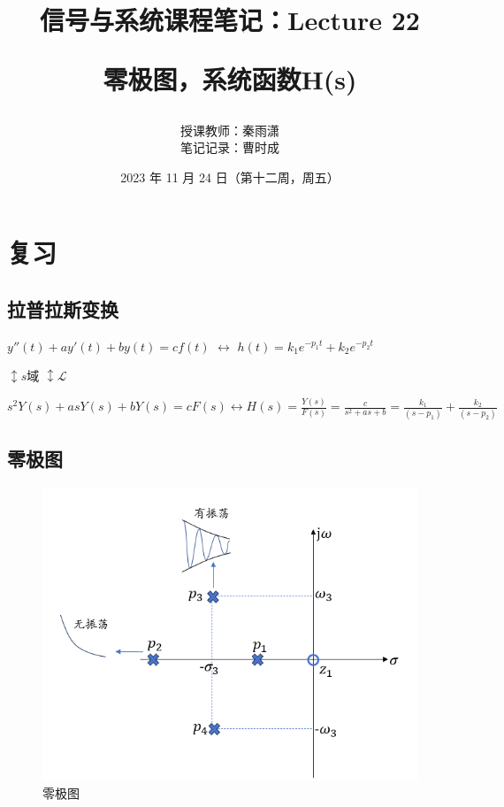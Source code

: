 \documentclass[UTF8]{ctexart}
\begin{document}
\title{信号与系统课程笔记：Lecture 22\par
零极图，系统函数H(s)}
\author{授课教师：秦雨潇 \\
        笔记记录：曹时成}
\date{2023 年 11 月 24 日（第十二周，周五）}
\maketitle

\section{复习}
\subsection{拉普拉斯变换}
$y''(t) + ay'(t) + by(t) = cf(t)$ \qquad $ \longleftrightarrow $ \qquad $ h(t)=k_1e^{-p_1t}+k_2e^{-p_2t}$ \par
\qquad \qquad $\updownarrow s \text{域}$ \qquad \qquad \qquad \qquad \qquad \qquad \qquad \qquad $\updownarrow \mathscr{L}$ \par
$s^2Y(s)+asY(s)+bY(s)=cF(s)\longleftrightarrow H(s)=\frac{Y(s)}{F(s)}=\frac{c}{s^2+as+b}= \frac{k_{1}}{(s-p_1)}+\frac{k_{2}}{(s-p_2)} $ \par
\subsection{零极图}
\begin{figure}[h]
    \centering         %
    \includegraphics[scale=0.45]{1.png}
    \caption{零极图}
\end{figure}
\end{document}
